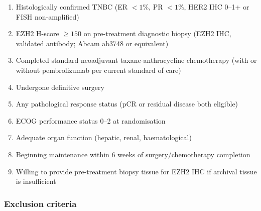 \documentclass[12pt, a4paper]{article}
\begin{document}
\begin{enumerate}
  \item Histologically confirmed TNBC
        (ER $<1\%$, PR $<1\%$, HER2 IHC 0--1+
        or FISH non-amplified)

  \item EZH2 H-score $\geq 150$ on pre-treatment
        diagnostic biopsy (EZH2 IHC, validated
        antibody; Abcam ab3748 or equivalent)

  \item Completed standard neoadjuvant
        taxane-anthracycline chemotherapy
        (with or without pembrolizumab per
        current standard of care)

  \item Undergone definitive surgery

  \item Any pathological response status
        (pCR or residual disease both eligible)

  \item ECOG performance status 0--2 at
        randomisation

  \item Adequate organ function (hepatic,
        renal, haematological)

  \item Beginning maintenance within 6 weeks
        of surgery/chemotherapy completion

  \item Willing to provide pre-treatment
        biopsy tissue for EZH2 IHC if
        archival tissue is insufficient
\end{enumerate}

\subsubsection{Exclusion criteria}
\end{document}
